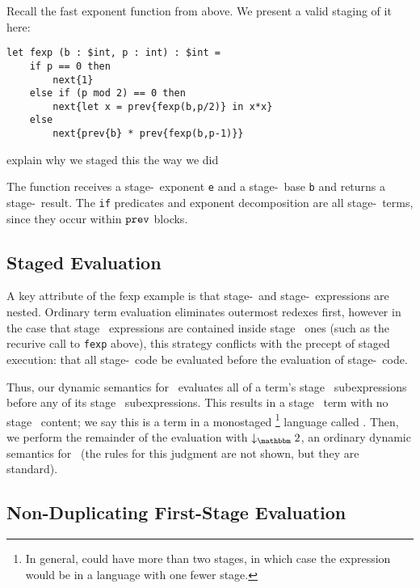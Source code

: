 Recall the fast exponent function from above.
We present a valid staging of it here:
\begin{lstlisting} 
let fexp (b : $int, p : int) : $int =
	if p == 0 then
		next{1}
	else if (p mod 2) == 0 then
		next{let x = prev{fexp(b,p/2)} in x*x}
	else
		next{prev{b} * prev{fexp(b,p-1)}}		
\end{lstlisting}

\TODO explain why we staged this the way we did

The function receives a stage-\bbone\ exponent {\tt e} and a stage-\bbtwo\ base {\tt b} and returns a stage-\bbtwo\ result. 
The {\tt if} predicates and exponent decomposition are all stage-\bbone\ terms, since they occur within ${\tt prev}$ blocks.

\subsection{Staged Evaluation}
\label{sec:stagedsemantics}

A key attribute of the fexp example is that stage-\bbone\ and stage-\bbtwo\ expressions are nested. 
Ordinary term evaluation eliminates outermost redexes first, 
however in the case that stage \bbone\ expressions are contained inside stage \bbtwo\ ones 
(such as the recurive call to {\tt fexp} above), 
this strategy conflicts with the precept of staged execution: 
that all stage-\bbone\ code be evaluated before the evaluation of stage-\bbtwo\ code. 

Thus, our dynamic semantics for \lang\ evaluates all of a term's stage \bbone\
subexpressions before any of its stage \bbtwo\ subexpressions. This results in a
stage \bbtwo\ term with no stage \bbone\ content; we say this is a term in a
monostaged
\footnote{In general, \lang could have more than two stages, in which case the
expression would be in a language with one fewer stage.}
language called \langTwo. Then, we perform the remainder of the evaluation with 
$\tworedsym$, an ordinary dynamic semantics for \langTwo\ (the rules for this
judgment are not shown, but they are standard).

\subsection{Non-Duplicating First-Stage Evaluation}

